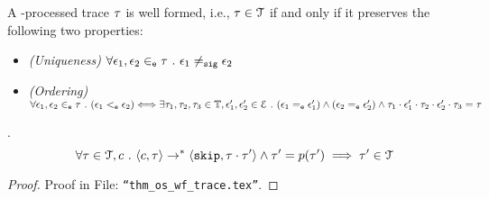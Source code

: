 %
%

%
%
%
%
\begin{defn}
\label{def:wf_trace}
A -processed trace $\mathtt{\tau}$ is well formed, i.e., $\mathtt{\tau} \in \mathcal{T}$ if and only if it preserves the following two properties:
\begin{itemize}
\item{\emph{(Uniqueness)}} 
$\forall \mathtt{\epsilon}_1, \mathtt{\epsilon}_2 \in_{\mathtt{e}} \mathtt{\tau} ~.~ \mathtt{\epsilon}_1 \neq_{\mathtt{sig}} \mathtt{\epsilon}_2$
%
\item{\emph{(Ordering)}} $\forall \mathtt{\epsilon}_1, \mathtt{\epsilon}_2 \in_{\mathtt{e}} \mathtt{\tau} ~.~ 
(\mathtt{\epsilon}_1 <_{\mathtt{e}} \mathtt{\epsilon}_2) \Longleftrightarrow
\exists \mathtt{\tau}_1, \mathtt{\tau}_2, \mathtt{\tau}_3 \in \mathbb{T},
 \mathtt{\epsilon}_1', \mathtt{\epsilon}_2' \in \mathcal{E} ~.~
(\mathtt{\epsilon}_1 =_{\mathtt{e}} \mathtt{\epsilon}_1') \land (\mathtt{\epsilon}_2 =_{\mathtt{e}} \mathtt{\epsilon}_2')
\land \mathtt{\tau}_1 \cdot \mathtt{\epsilon}_1' \cdot \mathtt{\tau}_2 \cdot \mathtt{\epsilon}_2' \cdot \mathtt{\tau}_3 = \mathtt{\tau}$
\end{itemize}
\end{defn}
%
%
\begin{thm}.
\label{thm:os_wf_trace}
\\
\[
\forall \mathtt{\tau} \in \mathcal{T}, c ~.~
\langle c, \mathtt{\tau} \rangle \to^{*} \langle \mathtt{skip}, \mathtt{\tau} \cdot \mathtt{\tau}' \rangle \land \mathtt{\tau}' = p(\mathtt{\tau}')
\implies
\mathtt{\tau}' \in \mathcal{T}
\] 
%
\end{thm}
\begin{proof}
Proof in File: {\tt ``thm\_os\_wf\_trace.tex''}.
% 
\end{proof}
